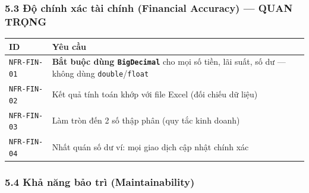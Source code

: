 \documentclass[11pt,a4paper]{article}
\newcounter{none}
\newcommand{\faintline}{\noalign{\global\arrayrulecolor{faintgray}}\hline\noalign{\global\arrayrulecolor{black}}} %
\begin{document}
\subsubsection{5.3 Độ chính xác tài chính (Financial Accuracy) --- QUAN TRỌNG}\label{ux111ux1ed9-chuxednh-xuxe1c-tuxe0i-chuxednh-financial-accuracy-quan-trux1ecdng}

{\def\LTcaptype{none}
\begin{longtable}[]{@{}
  >{\raggedright\arraybackslash}p{}
  >{\raggedright\arraybackslash}p{}@{}}
\toprule\noalign{}
\begin{minipage}[b]{\linewidth}\raggedright
ID
\end{minipage} & \begin{minipage}[b]{\linewidth}\raggedright
Yêu cầu
\end{minipage} \\
\midrule\noalign{}
\endhead
\bottomrule\noalign{}
\endlastfoot
\texttt{NFR-FIN-01} & \textbf{Bắt buộc dùng \texttt{BigDecimal}} cho mọi số tiền, lãi suất, số dư --- không dùng \texttt{double}/\texttt{float} \\ \faintline
\texttt{NFR-FIN-02} & Kết quả tính toán khớp với file Excel (đối chiếu dữ liệu) \\ \faintline
\texttt{NFR-FIN-03} & Làm tròn đến 2 số thập phân (quy tắc kinh doanh) \\ \faintline
\texttt{NFR-FIN-04} & Nhất quán số dư ví: mọi giao dịch cập nhật chính xác \\
\end{longtable}
}

\subsubsection{5.4 Khả năng bảo trì (Maintainability)}\label{khux1ea3-nux103ng-bux1ea3o-truxec-maintainability}
\end{document}
